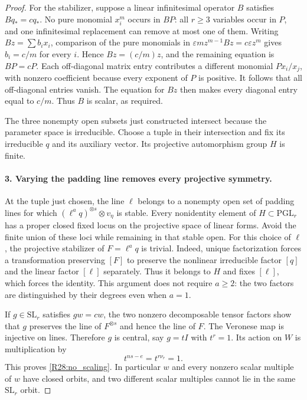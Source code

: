 \begin{proof}
For the stabilizer, suppose a linear infinitesimal operator
$B$ satisfies $Bq_*=cq_*$. No pure monomial $x_i^m$ occurs
in $BP$: all $r\geq3$ variables occur in $P$, and one
infinitesimal replacement can remove at most one of them.
Writing $Bz=\sum b_i x_i$, comparison of the pure monomials
in $\varepsilon m z^{m-1}Bz=c\varepsilon z^m$ gives
$b_i=c/m$ for every $i$. Hence $Bz=(c/m)z$, and the remaining
equation is $BP=cP$. Each off-diagonal matrix entry contributes
a different monomial $P x_i/x_j$, with nonzero coefficient
because every exponent of $P$ is positive. It follows that
all off-diagonal entries vanish. The equation for $Bz$ then
makes every diagonal entry equal to $c/m$. Thus $B$ is scalar,
as required.

The three nonempty open subsets just constructed intersect
because the parameter space is irreducible. Choose a tuple in
their intersection and fix its irreducible $q$ and its auxiliary
vector. Its projective automorphism group $H$ is finite.

\paragraph{3. Varying the padding line removes every projective symmetry.}
At the tuple just chosen, the line $\ell$ belongs to a
nonempty open set of padding lines for which
$(\ell^a q)^{\otimes s}\otimes v_\eta$ is stable.
Every nonidentity element of $H\subset\mathrm{PGL}_r$ has
a proper closed fixed locus on the projective space of linear
forms. Avoid the finite union of these loci while remaining
in that stable open. For this choice of $\ell$, the projective
stabilizer of $F=\ell^a q$ is trivial. Indeed, unique
factorization forces a transformation preserving $[F]$ to
preserve the nonlinear irreducible factor $[q]$ and the linear
factor $[\ell]$ separately. Thus it belongs to $H$ and fixes
$[\ell]$, which forces the identity. This argument does not
require $a\geq2$: the two factors are distinguished by their
degrees even when $a=1$.

If $g\in\mathrm{SL}_r$ satisfies $gw=cw$, the two nonzero
decomposable tensor factors show that $g$ preserves the line
of $F^{\otimes s}$ and hence the line of $F$. The Veronese
map is injective on lines. Therefore $g$ is central, say
$g=tI$ with $t^r=1$. Its action on $W$ is multiplication by
\[
 t^{ns-e}=t^{r\nu_r}=1.
\]
This proves \eqref{R28:no_scaling}. In particular $w$ and
every nonzero scalar multiple of $w$ have closed orbits,
and two different scalar multiples cannot lie in the same
$\mathrm{SL}_r$ orbit.


\end{proof}
